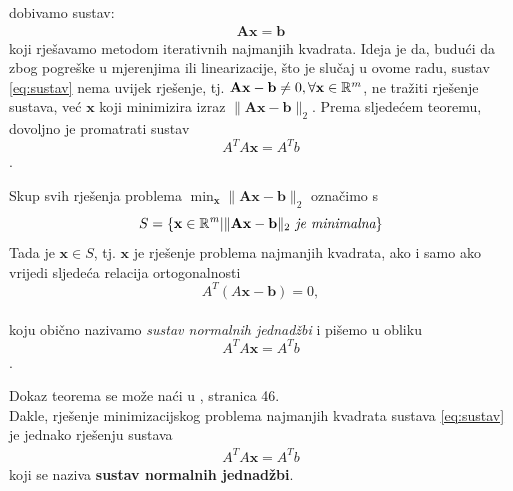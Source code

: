 \documentclass[a4paper,twoside,12pt]{memoir} %
\begin{document}
dobivamo sustav:
\begin{align}\label{eq:sustav}
\mathbf{A}\mathbf{x} = \mathbf{b}
\end{align}
koji rješavamo metodom iterativnih najmanjih kvadrata.\label{stranica:nastavakLS}
Ideja je da, budući da zbog pogreške u mjerenjima ili linearizacije, što je slučaj u ovome radu, sustav \ref{eq:sustav} nema uvijek rješenje, tj. 
$\mathbf{A}\mathbf{x} - \mathbf{b} \not = 0, \forall \mathbf{x} \in \mathbb{R}^m$,
ne tražiti rješenje sustava, već $\mathbf{x}$ koji minimizira izraz $\|\mathbf{A}\mathbf{x} - \mathbf{b}\|_2$.
Prema sljedećem teoremu, dovoljno je promatrati sustav
$$ A^TA\mathbf{x} = A^Tb $$.

\begin{thm}
	Skup svih rješenja problema $\min_\mathbf{x}\| \mathbf{A}\mathbf{x} - \mathbf{b} \|_2$ označimo s
	$$ S= \{\mathbf{x} \in \mathbb{R}^\mathit{m} | \| \mathbf{A}\mathbf{x} - \mathbf{b} \|_2 \textit{ je minimalna} \} $$
	Tada je $\mathbf{x}  \in S$, tj. $\mathbf{x}$ je rješenje problema najmanjih kvadrata, ako i samo ako vrijedi sljedeća relacija ortogonalnosti 
	$$A^T(A\mathbf{x}-\mathbf{b}) = 0,$$
	\\ koju obično nazivamo \textit{sustav normalnih jednadžbi} i pišemo u obliku 
	$$ A^TA\mathbf{x} = A^Tb $$.
\end{thm}
Dokaz teorema se može naći u \cite{singer07}, stranica 46.\\
Dakle, rješenje minimizacijskog problema najmanjih kvadrata sustava \ref{eq:sustav} je jednako rješenju sustava 
\begin{align}\label{eq:sustavProj}
A^TA\mathbf{x} = A^Tb 
\end{align}
koji se naziva \textbf{sustav normalnih jednadžbi}.
\end{document}
